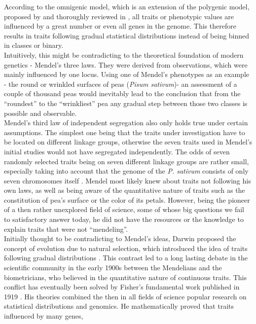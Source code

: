 According to the omnigenic model, which is an extension of the polygenic model, proposed
by \cite{boyle2017expanded} and thoroughly reviewed in \cite{timpson2018}, all traits or
phenotypic values are influenced by a great number or even all genes in the genome. This
therefore results in traits following gradual statistical distributions instead of being
binned in classes or
binary.\\
Intuitively, this might be contradicting to the theoretical foundation of modern genetics
- Mendel's three laws. They were derived from observations, which were mainly influenced
by one locus. Using one of Mendel's phenotypes as an example - the round or wrinkled
surfaces of peas (\textit{Pisum sativum})- an assessment of a couple of thousand peas
would inevitably lead to the conclusion that from the ``roundest'' to the ``wrinkliest''
pea any gradual step between those two classes is
possible and observable. \\
Mendel's third law of independent segregation also only holds true under certain
assumptions. The simplest one being that the traits under investigation have to be located
on different linkage groups, otherwise the seven traits used in Mendel's initial studies
would not have segregated independently. The odds of seven randomly selected traits being
on seven different linkage groups are rather small, especially taking into account that
the genome of the \textit{P. sativum} consists of only seven chromosomes itself
\cite{kalo2004}. Mendel most likely knew about traits not following his own laws, as well
as being aware of the quantitative nature of traits such as the constitution of pea's
surface or the color of its petals. However, being the pioneer of a then rather unexplored
field of science, some of whose big questions we fail to satisfactory answer today, he did
not have
the resources or the knowledge to explain traits that were not ``mendeling''. \\
Initially thought to be contradicting to Mendel's ideas, Darwin proposed the concept of
evolution due to natural selection, which introduced the idea of traits following gradual
distributions \cite{darwin1859}. This contrast led to a long lasting debate in the
scientific community in the early 1900s between the Mendelians and the biometricians, who
believed in the quantitative nature of continuous traits. This conflict has eventually
been solved by Fisher's fundamental work published in 1919 \cite{fisher1919xv}. His
theories combined the then in all fields of science popular research on statistical
distributions and genomics. He mathematically proved that traits influenced by many genes,
